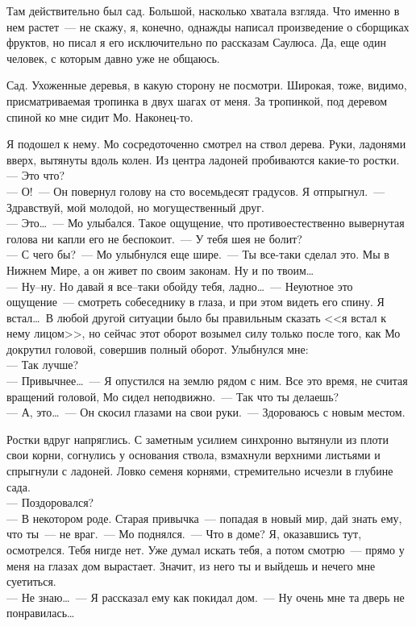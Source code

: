 Там действительно был сад. Большой, насколько хватала взгляда. Что именно в нем 
растет~--- не скажу, я, конечно, однажды написал произведение о сборщиках 
фруктов, но писал я его исключительно по рассказам Саулюса. Да, еще один человек, с 
которым давно уже не общаюсь.

Сад. Ухоженные деревья, в какую сторону не посмотри. Широкая, тоже, видимо, 
присматриваемая тропинка в двух шагах от меня. За тропинкой, под деревом спиной 
ко мне сидит Мо. Наконец-то.

Я подошел к нему. Мо сосредоточенно смотрел на ствол дерева. Руки, ладонями 
вверх, вытянуты вдоль колен. Из центра ладоней пробиваются какие-то ростки.\\
--- Это что?\\
--- О!~--- Он повернул голову на сто восемьдесят градусов. Я отпрыгнул.~--- 
Здравствуй, мой молодой, но могущественный друг.\\
--- Это\ldots~--- Мо улыбался. Такое ощущение, что противоестественно вывернутая 
голова ни капли его не беспокоит.~--- У тебя шея не болит?\\
--- С чего бы?~--- Мо улыбнулся еще шире.~--- Ты все-таки сделал это. Мы в Нижнем 
Мире, а он живет по своим законам. Ну и по твоим\ldots\\
--- Ну--ну. Но давай я все--таки обойду тебя, ладно\ldots~--- Неуютное это 
ощущение~--- смотреть собеседнику в глаза, и при этом видеть его спину. Я встал\ldots\ В 
любой другой ситуации было бы правильным сказать <<я встал к нему лицом>>, но сейчас 
этот оборот возымел силу только после того, как Мо докрутил головой, совершив 
полный оборот. Улыбнулся мне:\\
--- Так лучше?\\
--- Привычнее\ldots~--- Я опустился на землю рядом с ним. Все это время, не 
считая вращений головой, Мо сидел неподвижно.~--- Так что ты делаешь?\\
--- А, это\ldots~--- Он скосил глазами на свои руки.~--- Здороваюсь с новым 
местом. 

Ростки вдруг напряглись. С заметным усилием синхронно вытянули из плоти свои 
корни, согнулись у основания ствола, взмахнули верхними листьями и спрыгнули с 
ладоней. Ловко семеня корнями, стремительно исчезли в глубине сада.\\
--- Поздоровался?\\
--- В некотором роде. Старая привычка~--- попадая в новый мир, дай знать ему, что 
ты~--- не враг.~--- Мо поднялся.~--- Что в доме? Я, оказавшись тут, осмотрелся. Тебя 
нигде нет. Уже думал искать тебя, а потом смотрю~--- прямо у меня на глазах дом 
вырастает. Значит, из него ты и выйдешь и нечего мне суетиться.\\
--- Не знаю\ldots~--- Я рассказал ему как покидал дом.~--- Ну очень мне та дверь 
не понравилась\ldots


